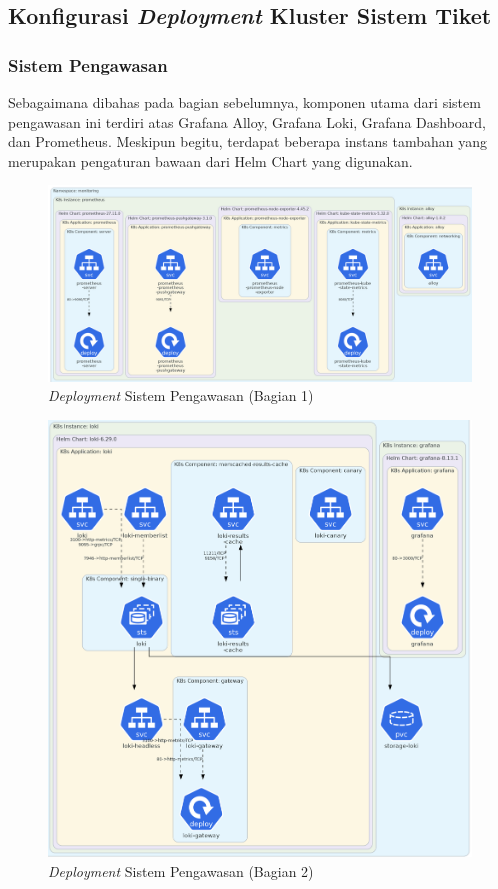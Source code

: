\subsection{Konfigurasi \textit{Deployment} Kluster Sistem Tiket}

\subsubsection{Sistem Pengawasan}

Sebagaimana dibahas pada bagian sebelumnya, komponen utama dari sistem pengawasan ini terdiri atas Grafana Alloy, Grafana Loki, Grafana Dashboard, dan Prometheus. Meskipun begitu, terdapat beberapa instans tambahan yang merupakan pengaturan bawaan dari Helm Chart yang digunakan.

\begin{figure}[htbp!]
    \centering
    \includegraphics[width=1\textwidth]{resources/chapter-4/monitoring-1.png}
    \caption{\textit{Deployment} Sistem Pengawasan (Bagian 1)}
    \label{fig:deployment-monitoring-1}
\end{figure}

\begin{figure}[htbp!]
    \centering
    \includegraphics[width=1\textwidth]{resources/chapter-4/monitoring-2.png}
    \caption{\textit{Deployment} Sistem Pengawasan (Bagian 2)}
    \label{fig:deployment-monitoring-2}
\end{figure}

